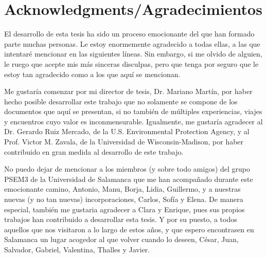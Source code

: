 



\bigskip

\begingroup
\let\clearpage\relax
\let\cleardoublepage\relax
\let\cleardoublepage\relax
\chapter*{Acknowledgments/Agradecimientos}
El desarrollo de esta tesis ha sido un proceso emocionante del que han formado parte muchas personas. Le estoy enormemente agradecido a todas ellas, a las que intentaré mencionar en las siguientes l\'{i}neas. Sin embargo, si me olvido de alguien, le ruego que acepte mis m\'{a}s sinceras disculpas, pero que tenga por seguro que le estoy tan agradecido como a los que aquí se mencionan.

Me gustaría comenzar por mi director de tesis, Dr. Mariano Martín, por haber hecho posible desarrollar este trabajo que no solamente se compone de los documentos que aqu\'{i} se presentan, si no también de m\'{u}ltiples experiencias, viajes y encuentros cuyo valor es inconmensurable. Igualmente, me gustaría agradecer al Dr. Gerardo Ruiz Mercado, de la U.S. Environmental Protection Agency, y al Prof. Victor M. Zavala, de la Universidad de Wisconsin-Madison, por haber contribuido en gran medida al desarrollo de este trabajo.

No puedo dejar de mencionar a los miembros (y sobre todo amigos) del grupo PSEM3 de la Universidad de Salamanca que me han acompañado durante este emocionante camino, Antonio, Manu, Borja, Lidia, Guillermo, y a nuestras nuevas (y no tan nuevas) incorporaciones, Carlos, Sof\'{i}a y Elena. De manera especial, tambi\'{e}n me gustaria agradecer a Clara y Enrique, pues sus propios trabajos han contribuido a desarrollar esta tesis. Y por su puesto, a todos aquellos que nos visitaron a lo largo de estos años, y que espero encontrasen en Salamanca un lugar acogedor al que volver cuando lo deseen, César, Juan, Salvador, Gabriel, Valentina, Thalles y Javier.

